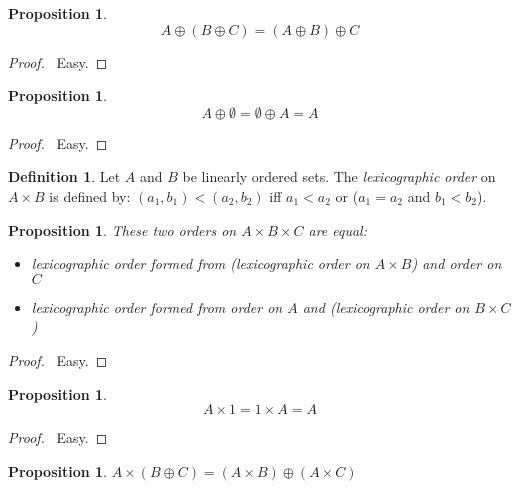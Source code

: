 \documentclass{report}
\let\qed\relax
\newtheorem{proposition}[axiom]{Proposition}
\theoremstyle{definition}
\newtheorem{definition}[axiom]{Definition}
\begin{document}
    \begin{proposition}
        \[ A \oplus (B \oplus C) = (A \oplus B) \oplus C \]
    \end{proposition}

    \begin{proof}
        \pf\ Easy. \qed
    \end{proof}

    \begin{proposition}
        \[ A \oplus \emptyset = \emptyset \oplus A = A \]
    \end{proposition}

    \begin{proof}
        \pf\ Easy. \qed
    \end{proof}

    \begin{definition}
        Let $A$ and $B$ be linearly ordered sets. The \emph{lexicographic order} on $A \times B$ is
        defined by: $(a_1,b_1) < (a_2,b_2)$ iff $a_1 < a_2$ or ($a_1 = a_2$ and $b_1 < b_2$).
    \end{definition}

    \begin{proposition}
        These two orders on $A \times B \times C$ are equal:
        \begin{itemize}
            \item lexicographic order formed from (lexicographic order on $A \times B$) and order on $C$
            \item lexicographic order formed from order on $A$ and (lexicographic order on $B \times C$)
        \end{itemize}
    \end{proposition}

    \begin{proof}
        \pf\ Easy. \qed
    \end{proof}

    \begin{proposition}
        \[ A \times 1 = 1 \times A = A \]
    \end{proposition}

    \begin{proof}
        \pf\ Easy. \qed
    \end{proof}

    \begin{proposition}
        $A \times (B \oplus C) = (A \times B) \oplus (A \times C)$
    \end{proposition}
\end{document}
